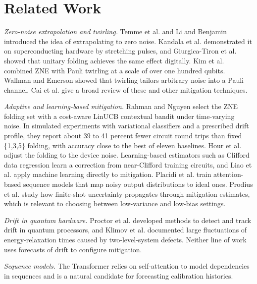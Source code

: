 \documentclass[conference]{IEEEtran}
\begin{document}
\section{Related Work}
\textit{Zero-noise extrapolation and twirling.} Temme et al. \cite{temme2017} and Li and Benjamin \cite{li2017} introduced the idea of extrapolating to zero noise. Kandala et al. \cite{kandala2019} demonstrated it on superconducting hardware by stretching pulses, and Giurgica-Tiron et al. \cite{giurgica2020} showed that unitary folding achieves the same effect digitally. Kim et al. \cite{kim2023} combined ZNE with Pauli twirling at a scale of over one hundred qubits. Wallman and Emerson \cite{wallman2016} showed that twirling tailors arbitrary noise into a Pauli channel. Cai et al. \cite{cai2023} give a broad review of these and other mitigation techniques.

\textit{Adaptive and learning-based mitigation.} Rahman and Nguyen \cite{rahman2026} select the ZNE folding set with a cost-aware LinUCB contextual bandit \cite{li2010} under time-varying noise. In simulated experiments with variational classifiers and a prescribed drift profile, they report about 39 to 41 percent fewer circuit round trips than fixed \{1,3,5\} folding, with accuracy close to the best of eleven baselines. Hour et al. \cite{hour2026} adjust the folding to the device noise. Learning-based estimators such as Clifford data regression \cite{czarnik2021,perezguijarro2026} learn a correction from near-Clifford training circuits, and Liao et al. \cite{liao2024} apply machine learning directly to mitigation. Placidi et al. \cite{placidi2026} train attention-based sequence models that map noisy output distributions to ideal ones. Prodius et al. \cite{prodius2026} study how finite-shot uncertainty propagates through mitigation estimates, which is relevant to choosing between low-variance and low-bias settings.

\textit{Drift in quantum hardware.} Proctor et al. \cite{proctor2020} developed methods to detect and track drift in quantum processors, and Klimov et al. \cite{klimov2018} documented large fluctuations of energy-relaxation times caused by two-level-system defects. Neither line of work uses forecasts of drift to configure mitigation.

\textit{Sequence models.} The Transformer \cite{vaswani2017} relies on self-attention to model dependencies in sequences and is a natural candidate for forecasting calibration histories.
\end{document}

